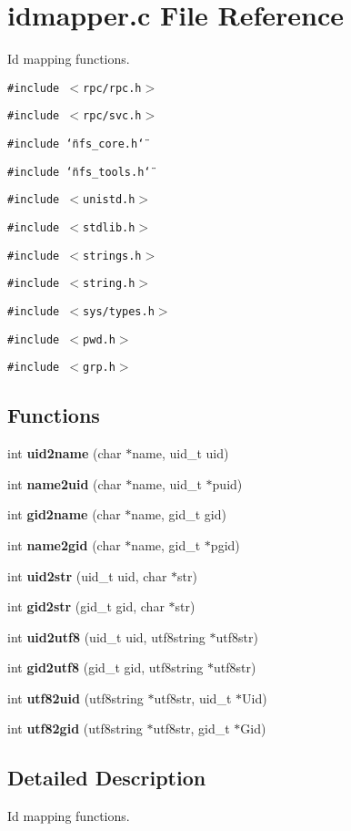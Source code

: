 \section{idmapper.c File Reference}
\label{idmapper_8c}
Id mapping functions. 

{\tt \#include $<$rpc/rpc.h$>$}\par
{\tt \#include $<$rpc/svc.h$>$}\par
{\tt \#include \char`\"{}nfs\_\-core.h\char`\"{}}\par
{\tt \#include \char`\"{}nfs\_\-tools.h\char`\"{}}\par
{\tt \#include $<$unistd.h$>$}\par
{\tt \#include $<$stdlib.h$>$}\par
{\tt \#include $<$strings.h$>$}\par
{\tt \#include $<$string.h$>$}\par
{\tt \#include $<$sys/types.h$>$}\par
{\tt \#include $<$pwd.h$>$}\par
{\tt \#include $<$grp.h$>$}\par
\subsection*{Functions}
\begin{CompactItemize}
\item 
int {\bf uid2name} (char $\ast$name, uid\_\-t uid)
\item 
int {\bf name2uid} (char $\ast$name, uid\_\-t $\ast$puid)
\item 
int {\bf gid2name} (char $\ast$name, gid\_\-t gid)
\item 
int {\bf name2gid} (char $\ast$name, gid\_\-t $\ast$pgid)
\item 
int {\bf uid2str} (uid\_\-t uid, char $\ast$str)
\item 
int {\bf gid2str} (gid\_\-t gid, char $\ast$str)
\item 
int {\bf uid2utf8} (uid\_\-t uid, utf8string $\ast$utf8str)
\item 
int {\bf gid2utf8} (gid\_\-t gid, utf8string $\ast$utf8str)
\item 
int {\bf utf82uid} (utf8string $\ast$utf8str, uid\_\-t $\ast$Uid)
\item 
int {\bf utf82gid} (utf8string $\ast$utf8str, gid\_\-t $\ast$Gid)
\end{CompactItemize}


\subsection{Detailed Description}
Id mapping functions. 

